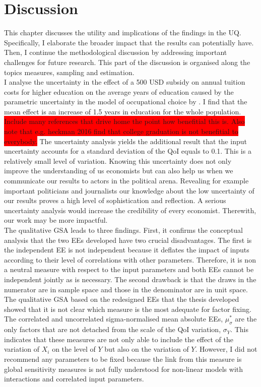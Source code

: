 \section{Discussion}
\thispagestyle{plain}  %

This chapter discusses the utility and implications of the findings in the UQ. Specifically, I elaborate the broader impact that the results can potentially have. Then, I continue the methodological discussion by addressing important challenges for future research. This part of the discussion is organised along the topics measures, sampling and estimation.\\

\noindent
I analyse the uncertainty in  the effect of a 500 USD subsidy on annual tuition costs for higher education on the average years of education caused by the parametric uncertainty in the model of occupational choice by \cite{Keane.1994}. I find that the mean effect is an increase of 1.5 years in education for the whole population. \colorbox{red}{Include many references that drive home the point how benefitial this is. Also note that e.g. heckman 2016 find that college graduation is not benefitial to everybody.}
The uncertainty analysis yields the additional result that the input uncertainty accounts for a standard deviation of the QoI equals to 0.1. This is a relatively small level of variation. Knowing this uncertainty does not only improve the understanding of us economists but can also help us when we communicate our results to actors in the political arena. Revealing for example important politicians and journalists our knowledge about the low uncertainty of our results proves a high level of sophistication and reflection. A serious uncertainty analysis would increase the credibility of every economist. Therewith, our work may be more impactful.\\

\noindent
The qualitative GSA leads to three findings.
First, it confirms the conceptual analysis that the two EEs developed have \cite{ge2017extending} two crucial disadvantages. The first is the independent EE is not independent because it deflates the impact of inputs according to their level of correlations with other parameters. Therefore, it is non a neutral measure with respect to the input parameters and both EEs cannot be independent jointly as is necessary. The second drawback is that the draws in the numerator are in sample space and those in the denominator are in unit space. The qualitative GSA based on the redesigned EEs that the thesis developed showed that it is not clear which measure is the most adequate for factor fixing. The correlated and uncorrelated sigma-normalised mean absolute EEs, $\mu_\sigma^*$ are the only factors that are not detached from the scale of the QoI variation, $\sigma_Y$. This indicates that these measures are not only able to include the effect of the variation of $X_i$ on the level of $Y$ but also on the variation of $Y$. However, I did not recommend any parameters to be fixed because the link from this measure is global sensitivity measures is not fully understood for non-linear models with interactions and correlated input parameters.\\

